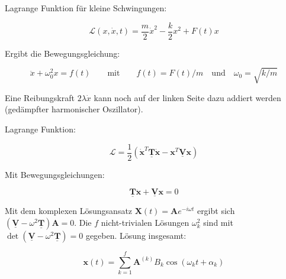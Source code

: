 
\begin{framedprop}[Bewegungsgleichungen]
	
	Lagrange Funktion für kleine Schwingungen:
	
	\[ \mathscr{L}(x, \dot x, t) = \frac{m}{2} \dot x^2 - \frac{k}{2} x^2 + F(t)x \]
	
	Ergibt die Bewegungsgleichung:
	
	\[ \ddot x + \omega_0^2 x = f(t) \qquad \textrm{mit} \qquad f(t) = F(t)/m \quad \textrm{und} \quad \omega_0 = \sqrt{k/m} \]
	
	Eine Reibungskraft $2\lambda \dot x$ kann noch auf der linken Seite dazu addiert werden (gedämpfter harmonischer Oszillator).
	
\end{framedprop}

\begin{framedprop}
	
	Lagrange Funktion:
	
	\[ \mathscr{L} = \frac{1}{2} (\mathbf{\dot x}^T \mathbf{\underline T} \mathbf{\dot x} - \mathbf{x}^T \mathbf{\underline V} \mathbf{x}) \]
	
	Mit Bewegungsgleichungen:
	
	\[ \mathbf{\underline T} \mathbf{\ddot x} + \mathbf{\underline V} \mathbf{x} = 0 \]
	
	Mit dem komplexen Lösungsansatz $\mathbf{X}(t) = \mathbf{A} e^{-i \omega t}$ ergibt sich $(\mathbf{\underline V} - \omega^2 \mathbf{\underline T}) \mathbf{A} = 0$. Die $f$ nicht-trivialen Lösungen $\omega_k^2$ sind mit $\det(\mathbf{\underline V} - \omega^2 \mathbf{\underline T}) = 0$ gegeben. Lösung insgesamt:
	
	\[ \mathbf{x}(t) = \sum_{k=1}^f \mathbf{A}^{(k)} B_k \cos(\omega_k t + \alpha_k) \]
	
\end{framedprop}
